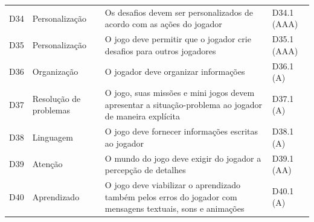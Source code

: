 \begin{longtable}{p{1.1cm}p{2.6cm}p{7.2cm}p{2.6cm}}
D34 & Personalização & Os desafios devem ser personalizados de acordo com as ações do jogador & D34.1 (AAA) \\
D35 & Personalização & O jogo deve permitir que o jogador crie desafios para outros jogadores & D35.1 (AAA) \\
D36 & Organização & O jogador deve organizar informações & D36.1 (A) \\
D37 & Resolução de problemas & O jogo, suas missões e mini jogos devem apresentar a situação-problema ao jogador de maneira explícita & D37.1 (A) \\
D38 & Linguagem & O jogo deve fornecer informações escritas ao jogador & D38.1 (A) \\
D39 & Atenção & O mundo do jogo deve exigir do jogador a percepção de detalhes & D39.1 (AA) \\
D40 & Aprendizado & O jogo deve viabilizar o aprendizado também pelos erros do jogador com mensagens textuais, sons e animações & D40.1 (A) \\
\end{longtable}

